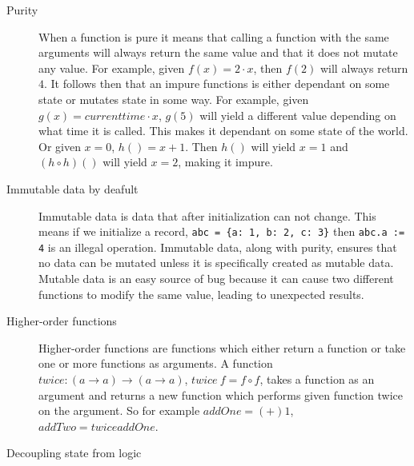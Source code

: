 \begin{description}
\item[ Purity ]

When a function is pure it means that calling a function with the same arguments
        will always return the same value and that it does not mutate any value.
        For example, given $f(x) = 2\cdot x$, then $f(2)$ will always
        return $4$. It follows then that an impure functions is either dependant
        on some state or mutates state in some way. For example, given $g(x) =
        currenttime \cdot x$, $g(5)$ will yield a different value depending on
        what time it is called. This makes it dependant on some state of the
        world. Or given $x=0$, $h()=x+1$. Then $h()$ will yield $x=1$ and $(h
        \circ h)()$ will yield $x=2$, making it impure.~\cite{wikipedia_pure}

\item[ Immutable data by deafult ]

Immutable data is data that after initialization can not change. This means if
we initialize a record, \texttt{abc = \{a: 1, b: 2, c: 3\}} then \texttt{abc.a
:= 4} is an illegal operation. Immutable data, along with purity, ensures that
no data can be mutated unless it is specifically created as mutable data.
Mutable data is an easy source of bug because it can cause two different
functions to modify the same value, leading to unexpected results.

\item[Higher-order functions]

    Higher-order functions are functions which either return a function or take
    one or more functions as arguments. A function $twice :
    (a\rightarrow a)\rightarrow (a\rightarrow a)$, $twice\ f = f \circ f$, takes
    a function as an argument and returns a new function which performs given
    function twice on the argument. So for example $addOne = (+) 1$, $addTwo =
    twice addOne$.

\item[Decoupling state from logic]


\end{description}
